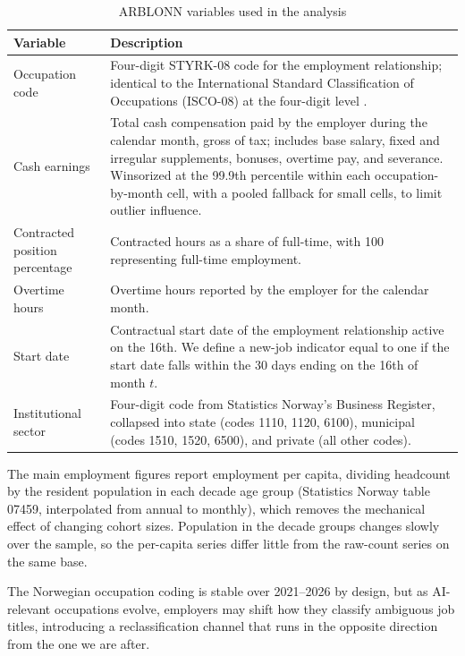 \documentclass[12pt]{article}
\begin{document}
\begin{table}[htbp]
\centering
\caption{ARBLONN variables used in the analysis}
\label{tab:arblonn_variables}
\footnotesize
\begin{tabular}{p{4.2cm}p{10cm}}
\toprule
Variable & Description \\
\midrule
Occupation code & Four-digit STYRK-08 code for the employment relationship; identical to the International Standard Classification of Occupations (ISCO-08) at the four-digit level \citep{ssb2011styrk}. \\[4pt]
Cash earnings & Total cash compensation paid by the employer during the calendar month, gross of tax; includes base salary, fixed and irregular supplements, bonuses, overtime pay, and severance. Winsorized at the 99.9th percentile within each occupation-by-month cell, with a pooled fallback for small cells, to limit outlier influence. \\[4pt]
Contracted position percentage & Contracted hours as a share of full-time, with 100 representing full-time employment. \\[4pt]
Overtime hours & Overtime hours reported by the employer for the calendar month. \\[4pt]
Start date & Contractual start date of the employment relationship active on the 16th. We define a new-job indicator equal to one if the start date falls within the 30 days ending on the 16th of month $t$. \\[4pt]
Institutional sector & Four-digit code from Statistics Norway's Business Register, collapsed into state (codes 1110, 1120, 6100), municipal (codes 1510, 1520, 6500), and private (all other codes). \\
\bottomrule
\end{tabular}
\end{table}

The main employment figures report employment per capita, dividing headcount by the resident population in each decade age group (Statistics Norway table 07459, interpolated from annual to monthly), which removes the mechanical effect of changing cohort sizes. Population in the decade groups changes slowly over the sample, so the per-capita series differ little from the raw-count series on the same base.

The Norwegian occupation coding is stable over 2021--2026 by design, but as AI-relevant occupations evolve, employers may shift how they classify ambiguous job titles, introducing a reclassification channel that runs in the opposite direction from the one we are after.
\end{document}
